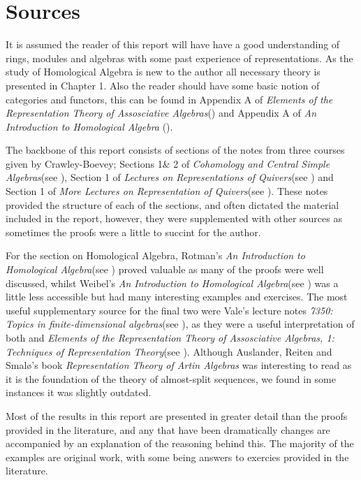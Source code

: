 \documentclass[11.5pt, twoside, a4paper, titlepage]{report}
\theoremstyle{definition}
\theoremstyle{plain}
\begin{document}
\section{Sources}

It is assumed the reader of this report will have have a good understanding of rings, modules and algebras with some past experience of representations. As the study of Homological Algebra is new to the author all necessary theory is presented in Chapter 1. Also the reader should have some basic notion of categories and functors, this can be found in Appendix A of \emph{Elements of the Representation Theory of Assosciative Algebras}(\cite{Assem}) and Appendix A of \emph{An Introduction to Homological Algebra} (\cite{Weibel}).
\vspace{0.5em}

The backbone of this report consists of sections of the notes from three courses given by Crawley-Boevey; Sections 1\& 2 of \emph{Cohomology and Central Simple Algebras}(see \cite{CB1}), Section 1 of \emph{Lectures on Representations of Quivers}(see \cite{CB2}) and Section 1 of \emph{More Lectures on Representation of Quivers}(see \cite{CB3}). These notes provided the structure of each of the sections, and often dictated the material included in the report, however, they were supplemented with other sources as sometimes the proofs were a little to succint for the author.
\vspace{0.5em}

For the section on Homological Algebra, Rotman's \emph{An Introduction to Homological Algebra}(see \cite{Rotman}) proved valuable as many of the proofs were well discussed, whilst Weibel's \emph{An Introduction to Homological Algebra}(see \cite{Weibel}) was a little less accessible but had many interesting examples and exercises. The most useful supplementary source for the final two were Vale's lecture notes \emph{7350: Topics in finite-dimensional algebras}(see \cite{Vale}), as they were a useful interpretation of both \cite{CB2} and \emph{Elements of the Representation Theory of Assosciative Algebras, 1: Techniques of Representation Theory}(see \cite{Assem}). Although Auslander, Reiten and Smal\o's book \emph{Representation Theory of Artin Algebras} was interesting to read as it is the foundation of the theory of almost-split sequences, we found in some instances it was slightly outdated.
\vspace{0.5em}

Most of the results in this report are presented in greater detail than the proofs provided in the literature, and any that have been dramatically changes are accompanied by an explanation of the reasoning behind this. The majority of the examples are original work, with some being answers to exercies provided in the literature.
\end{document}
